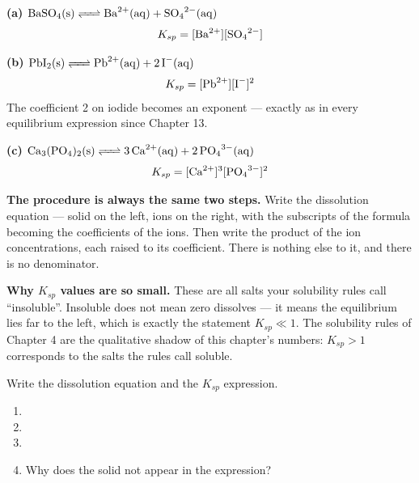\documentclass{apchem-worksheet}
\begin{document}
\begin{workedexample}
\textbf{(a) $\ce{BaSO4(s) <=> Ba^2+(aq) + SO4^2-(aq)}$}
\[ K_{sp} = [\ce{Ba^2+}][\ce{SO4^2-}] \]

\textbf{(b) $\ce{PbI2(s) <=> Pb^2+(aq) + 2I-(aq)}$}
\[ K_{sp} = [\ce{Pb^2+}][\ce{I-}]^{2} \]
The coefficient 2 on iodide becomes an exponent --- exactly as in every
equilibrium expression since Chapter 13.

\textbf{(c) $\ce{Ca3(PO4)2(s) <=> 3Ca^2+(aq) + 2PO4^3-(aq)}$}
\[ K_{sp} = [\ce{Ca^2+}]^{3}[\ce{PO4^3-}]^{2} \]

\textbf{The procedure is always the same two steps.} Write the
dissolution equation --- solid on the left, ions on the right, with the
subscripts of the formula becoming the coefficients of the ions. Then
write the product of the ion concentrations, each raised to its
coefficient. There is nothing else to it, and there is no denominator.

\textbf{Why $K_{sp}$ values are so small.} These are all salts your
solubility rules call ``insoluble''. Insoluble does not mean zero
dissolves --- it means the equilibrium lies far to the left, which is
exactly the statement $K_{sp} \ll 1$. The solubility rules of Chapter 4
are the qualitative shadow of this chapter's numbers: $K_{sp} > 1$
corresponds to the salts the rules call soluble.
\end{workedexample}

\begin{yourturn}
Write the dissolution equation and the $K_{sp}$ expression.
\begin{enumerate}[leftmargin=*,itemsep=0.5em]
  \item {} \workspace[1.6cm]
  \item {} \workspace[1.6cm]
  \item {} \workspace[1.8cm]
  \item Why does the solid not appear in the expression?
        \workspace[1.6cm]
\end{enumerate}
\end{yourturn}
\end{document}
